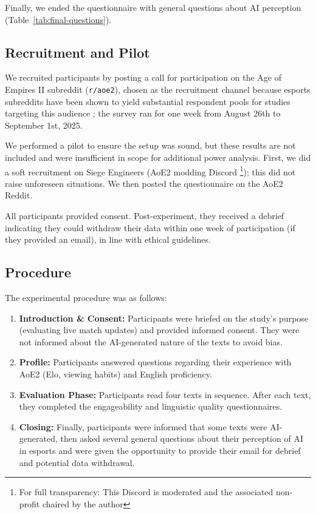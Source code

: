Finally, we ended the questionnaire with general questions about AI perception (Table~\ref{tab:final-questions}).

\subsection{Recruitment and Pilot}
We recruited participants by posting a call for participation on the Age of Empires II subreddit (\texttt{r/aoe2}), chosen as the recruitment channel because esports subreddits have been shown to yield substantial respondent pools for studies targeting this audience \cite{hamari2017, bidermayer2020}; the survey ran for one week from August 26th to September 1st, 2025.

We performed a pilot to ensure the setup was sound, but these results are not included and were insufficient in scope for additional power analysis. First, we did a soft recruitment on Siege Engineers (AoE2 modding Discord \footnote{For full transparency: This Discord is moderated and the associated non-profit chaired by the author}); this did not raise unforeseen situations. We then posted the questionnaire on the AoE2 Reddit.

All participants provided consent. Post-experiment, they received a debrief indicating they could withdraw their data within one week of participation (if they provided an email), in line with ethical guidelines.

\subsection{Procedure}
The experimental procedure was as follows:
\begin{enumerate}[noitemsep,topsep=0pt]
  \item \textbf{Introduction \& Consent:} Participants were briefed on the study's purpose (evaluating live match updates) and provided informed consent. They were not informed about the AI-generated nature of the texts to avoid bias.
  \item \textbf{Profile:} Participants answered questions regarding their experience with AoE2 (Elo, viewing habits) and English proficiency.
  \item \textbf{Evaluation Phase:} Participants read four texts in sequence. After each text, they completed the engageability and linguistic quality questionnaires.
  \item \textbf{Closing:} Finally, participants were informed that some texts were AI-generated, then asked several general questions about their perception of AI in esports and were given the opportunity to provide their email for debrief and potential data withdrawal.
\end{enumerate}

